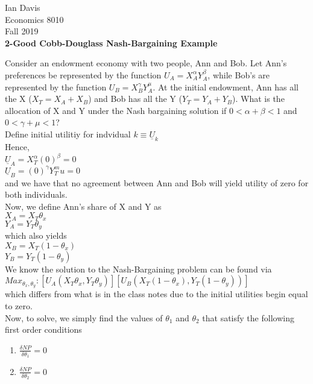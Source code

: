 \documentclass[11pt]{article}
\begin{document}
\begin{flushleft}
Ian Davis\\
Economics 8010\\
Fall 2019\\
\bigskip
\textbf{2-Good Cobb-Douglass Nash-Bargaining Example}\\
\end{flushleft}
Consider an endowment economy with two people, Ann and Bob. Let Ann's preferences be represented by the function $U_A = X_A^\alpha Y_A^\beta$, while Bob's are represented by the function $U_B = X_B^\gamma Y_A^\mu$. At the initial endowment, Ann has all the X ($X_T = X_A + X_B$) and Bob has all the Y ($Y_T = Y_A + Y_B$). What is the allocation of X and Y under the Nash bargaining solution if $0 < \alpha + \beta < 1$ and $0 < \gamma + \mu < 1$?\\
\bigskip
Define initial utilitiy for indvidual $k \equiv \underline{U}_k$\\
Hence,\\
\bigskip
$\underline{U}_A = X_T^\alpha (0)^\beta = 0$\\
$\underline{U}_B = (0)^\gamma Y_T^mu = 0$\\
\bigskip 
and we have that no agreement between Ann and Bob will yield utility of zero for both individuals.\\
\bigskip
Now, we define Ann's share of X and Y as\\
\bigskip
$X_A = X_T\theta_x$\\
$Y_A = Y_T\theta_y$\\
\bigskip
which also yields\\
\bigskip
$X_B = X_T(1-\theta_x)$\\
$Y_B = Y_T(1-\theta_y)$\\
\bigskip
We know the solution to the Nash-Bargaining problem can be found via\\
\bigskip
$Max_{\theta_x,\theta_y}: [U_A(X_T\theta_x,Y_T\theta_y)][U_B(X_T(1-\theta_x),Y_T(1-\theta_y))]$ \\
\bigskip
which differs from what is in the class notes due to the initial utilities begin equal to zero.\\
\bigskip
Now, to solve, we simply find the values of $\theta_1$ and $\theta_2$ that satisfy the following first order conditions\\
\begin{enumerate}
  \item $\frac{\delta NP}{\delta \theta_1} = 0$
  \item $\frac{\delta NP}{\delta \theta_2} = 0$
\end{enumerate}
\end{document}
